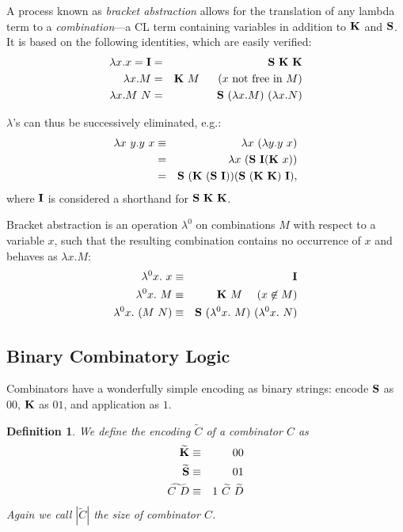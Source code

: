 \documentclass{article}
\newtheorem{definition}{Definition}
\newcommand{\baz}[1]{\lambda^0 #1.\ }
\newcommand{\CS}{{\bf S}}
\newcommand{\CK}{{\bf K}}
\newcommand{\CI}{{\bf I}}
\begin{document}
A process known as {\em bracket abstraction} allows for the translation
of any lambda term to a {\em combination}---a CL term
containing variables in addition to $\CK$ and $\CS$.
It is based on the following identities, which are easily verified:
\begin{eqnarray*}
\lambda x.x = \CI & = & \CS\ \CK\ \CK \\
\lambda x.M & = & \CK\ M \,\,\,\,\,\,\,\,\,\,(x \mbox{ not free in } M) \\
\lambda x.M\ N & = & \CS\ (\lambda x.M)\ (\lambda x.N)
\end{eqnarray*}

$\lambda$'s can thus be successively eliminated, e.g.:
\begin{eqnarray*}
\lambda x\ y.y\ x & \equiv & \lambda x\ (\lambda y.y\ x) \\
& = & \lambda x\ (\CS\ \CI (\CK\ x)) \\
& = & \CS\ (\CK\ (\CS\ \CI)) (\CS\ (\CK\ \CK)\ \CI),
\end{eqnarray*}
where $\CI$ is considered a shorthand for $\CS\ \CK\ \CK$.

Bracket abstraction is an operation $\lambda^0$ on combinations $M$
with respect to a variable $x$, such that the resulting combination
contains no occurrence of $x$ and behaves as $\lambda x.M$:
\begin{eqnarray*}
\baz{x}x & \equiv & \CI \\
\baz{x}M & \equiv & \CK\ M \,\,\,\,\,\,\,\,(x \not\in M) \\
\baz{x}(M\ N) & \equiv & \CS\ (\baz{x}M)\ (\baz{x}N)
\end{eqnarray*}

\subsection{Binary Combinatory Logic}
Combinators have a wonderfully simple
encoding as binary strings:
encode $\CS$ as $00$, $\CK$ as $01$, and application as $1$.

\begin{definition}
We define the encoding $\widetilde{C}$ of a combinator $C$ as
\begin{eqnarray*}
\widetilde{\CK} & \equiv & 00 \\
\widetilde{\CS} & \equiv & 01 \\
\widetilde{C\ D} & \equiv & 1\ \widetilde{C}\ \widetilde{D}
\end{eqnarray*}
Again we call $|\widetilde{C}|$ the {\em size} of combinator $C$.
\end{definition}
\end{document}
